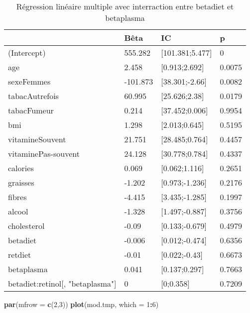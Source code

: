 \documentclass[]{article}
\newenvironment{Shaded}{\begin{snugshade}}{\end{snugshade}}
\newcommand{\KeywordTok}[1]{\textcolor[rgb]{0.13,0.29,0.53}{\textbf{#1}}}
\newcommand{\DataTypeTok}[1]{\textcolor[rgb]{0.13,0.29,0.53}{#1}}
\newcommand{\DecValTok}[1]{\textcolor[rgb]{0.00,0.00,0.81}{#1}}
\newcommand{\OperatorTok}[1]{\textcolor[rgb]{0.81,0.36,0.00}{\textbf{#1}}}
\newcommand{\NormalTok}[1]{#1}
\begin{document}
\begin{table}

\caption{\label{tab:unnamed-chunk-79}Régression linéaire multiple avec interraction entre betadiet et betaplasma}
\centering
\begin{tabular}[t]{l|l|l|l}
\hline
  & Bêta & IC & p\\
\hline
\rowcolor[HTML]{BBD2E1}  (Intercept) & 555.282 & [101.381;5.477] & 0\\
\hline
age & 2.458 & [0.913;2.692] & 0.0075\\
\hline
\rowcolor[HTML]{BBD2E1}  sexeFemmes & -101.873 & [38.301;-2.66] & 0.0082\\
\hline
tabacAutrefois & 60.995 & [25.626;2.38] & 0.0179\\
\hline
\rowcolor[HTML]{BBD2E1}  tabacFumeur & 0.214 & [37.452;0.006] & 0.9954\\
\hline
bmi & 1.298 & [2.013;0.645] & 0.5195\\
\hline
\rowcolor[HTML]{BBD2E1}  vitamineSouvent & 21.751 & [28.485;0.764] & 0.4457\\
\hline
vitaminePas-souvent & 24.128 & [30.778;0.784] & 0.4337\\
\hline
\rowcolor[HTML]{BBD2E1}  calories & 0.069 & [0.062;1.116] & 0.2651\\
\hline
graisses & -1.202 & [0.973;-1.236] & 0.2176\\
\hline
\rowcolor[HTML]{BBD2E1}  fibres & -4.415 & [3.435;-1.285] & 0.1997\\
\hline
alcool & -1.328 & [1.497;-0.887] & 0.3756\\
\hline
\rowcolor[HTML]{BBD2E1}  cholesterol & -0.09 & [0.133;-0.679] & 0.4979\\
\hline
betadiet & -0.006 & [0.012;-0.474] & 0.6356\\
\hline
\rowcolor[HTML]{BBD2E1}  retdiet & -0.01 & [0.022;-0.43] & 0.6673\\
\hline
betaplasma & 0.041 & [0.137;0.297] & 0.7663\\
\hline
\rowcolor[HTML]{BBD2E1}  betadiet:retinol[, "betaplasma"] & 0 & [0;0.358] & 0.7209\\
\hline
\end{tabular}
\end{table}

\begin{Shaded}
\begin{Highlighting}[]
\KeywordTok{par}\NormalTok{(}\DataTypeTok{mfrow =} \KeywordTok{c}\NormalTok{(}\DecValTok{2}\NormalTok{,}\DecValTok{3}\NormalTok{))}
\KeywordTok{plot}\NormalTok{(mod.tmp, }\DataTypeTok{which =} \DecValTok{1}\OperatorTok{:}\DecValTok{6}\NormalTok{)}
\end{Highlighting}
\end{Shaded}
\end{document}
